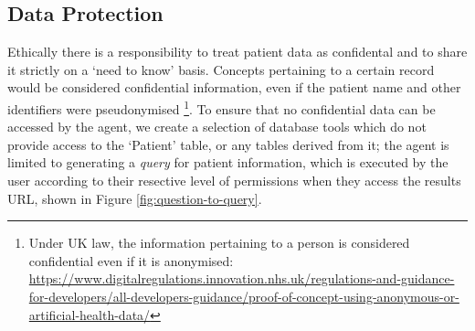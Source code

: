 \documentclass[11pt]{article}
\begin{document}



\subsection{Data Protection} 
Ethically there is a responsibility to treat patient data as confidental and to share it strictly on a `need to know' basis.
Concepts pertaining to a certain record would be considered confidential information, even if the patient name and other identifiers were pseudonymised
\footnote{Under UK law, the information pertaining to a person is considered confidential even if it is anonymised: \\
\tiny
\url{
https://www.digitalregulations.innovation.nhs.uk/regulations-and-guidance-for-developers/all-developers-guidance/proof-of-concept-using-anonymous-or-artificial-health-data/}
}. 
To ensure that no confidential data can be accessed by the agent, we create a selection of database tools which do not provide access to the `Patient' table, or any tables derived from it; the agent is limited to generating a \textit{query} for patient information, which is executed by the user according to their resective level of permissions when they access the results URL, shown in Figure \ref{fig:question-to-query}.
\end{document}
